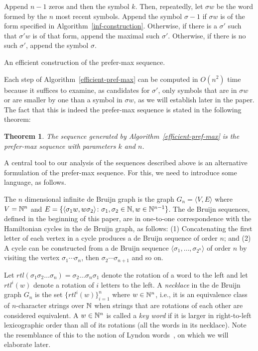 \documentclass{article} %
\newtheorem{theorem}{Theorem} \newtheorem{proposition}[theorem]{Proposition}
\theoremstyle{definition} \newtheorem{definition}[theorem]{Definition}
\newcommand{\T}[1]{\langle{#1}\rangle} \newcommand{\rr}[2]{R^{#2}({#1})}
\begin{document}
	\begin{algorithm} Append $n-1$ zeros and then the symbol $k$. Then, repeatedly,
		let $\sigma w$ be the word formed by the $n$ most recent symbols. Append the
		symbol $\sigma-1$ if $\sigma w$  is of the form specified in
		Algorithm~\ref{inf-construction}. Otherwise, if there is a  $\sigma'$ such that
		$\sigma'w$ is of that form, append the maximal such $\sigma'$. Otherwise, if
		there is no such $\sigma'$, append the symbol $\sigma$.
		
		\caption{An efficient construction of the prefer-max sequence.}
		\label{efficient-pref-max} 
	\end{algorithm}
	
	Each step of Algorithm~\ref{efficient-pref-max} can be computed in $O(n^2)$
	time because it suffices to examine, as candidates for $\sigma'$, only symbols
	that are in $\sigma w$ or are smaller by one than a symbol in $\sigma w$, as we
	will establish later in the paper. The fact that this is indeed the prefer-max
	sequence is stated in the following theorem:
	
	\begin{theorem} The sequence generated by Algorithm~\ref{efficient-pref-max} is
		the prefer-max sequence with parameters $k$ and $n$. \end{theorem}
	
	
	A central tool to our analysis of the sequences described above is an
	alternative formulation of the prefer-max sequence. For this, we need to
	introduce some language, as follows.
	
	The $n$ dimensional infinite de Bruijn graph is the graph $G_{n}=\T{V,E}$ where
	$V={\mathbb{N}}^n$ and $E=\{ \T{\sigma_1 w, w \sigma_2} \colon \sigma_1,\sigma_2\in\N, w
	\in \N^{n-1}\}$. The de Bruijn sequences, defined in the beginning of this
	paper, are in one-to-one correspondence with the Hamiltonian cycles in the de
	Bruijn graph, as follows: (1) Concatenating the first letter of each vertex in
	a cycle produces a de Bruijn sequence of order $n$; and (2) A cycle can be
	constructed from a de Bruijn sequence $\T{\sigma_1,\dots,\sigma_{2^n}}$ of
	order $n$ by visiting the vertex $\sigma_1\cdots\sigma_n$, then
	$\sigma_2\cdots\sigma_{n+1}$ and so on.
	
	Let $rtl(\sigma_1\sigma_2\dots\sigma_n) = \sigma_2\dots\sigma_n\sigma_1$ denote
	the rotation of a word to the left and let $rtl^i(w)$ denote a rotation of $i$
	letters to the left. A \emph{necklace} in the de Bruijn graph $G_n$ is the set
	$\{rtl^i(w)\}_{i=1}^n$ where $w \in {\mathbb{N}}^n$, i.e., it is an equivalence class of
	$n$-character strings over ${\mathbb{N}}$ when strings that are rotations of each other
	are considered equivalent. A $w\in{\mathbb{N}}^n$ is called a \emph{key word} if it is
	larger in right-to-left lexicographic order than all of its rotations (all the
	words in its necklace).  Note the resemblance of this to the notion of Lyndon
	words~\cite{Lyndon1954}, on which we will elaborate later.
	
\end{document}
